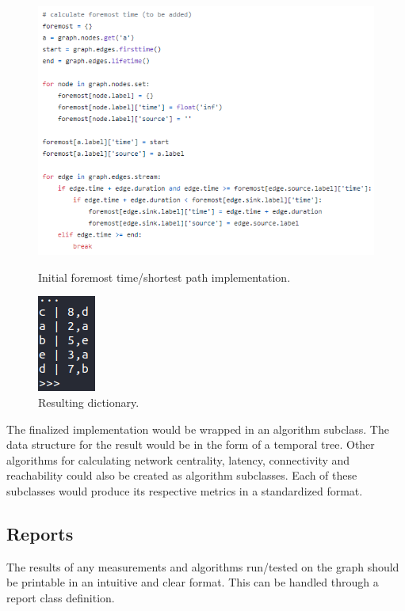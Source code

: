 \begin{design}
\clearpage
\begin{figure}[t]
  \centering
  \begin{minipage}[b]{0.4\textwidth}
    \centering
    \includegraphics[scale=0.8]{images/foremost_code.PNG}
    \caption{Initial foremost time/shortest path implementation.}
  \end{minipage}
  \hfill
  \begin{minipage}[b]{0.4\textwidth}
    \centering
    \includegraphics[scale=0.7]{images/foremost_result.PNG}
    \caption{Resulting dictionary.}
  \end{minipage}
\end{figure}
The finalized implementation would be wrapped in an algorithm subclass. The data structure for the result would be in the form of a temporal tree. Other algorithms for calculating network centrality, latency, connectivity and reachability could also be created as algorithm subclasses. Each of these subclasses would produce its respective metrics in a standardized format. 
\subsection{Reports}
The results of any measurements and algorithms run/tested on the graph should be printable in an intuitive and clear format. This can be handled through a report class definition.

\end{design}
